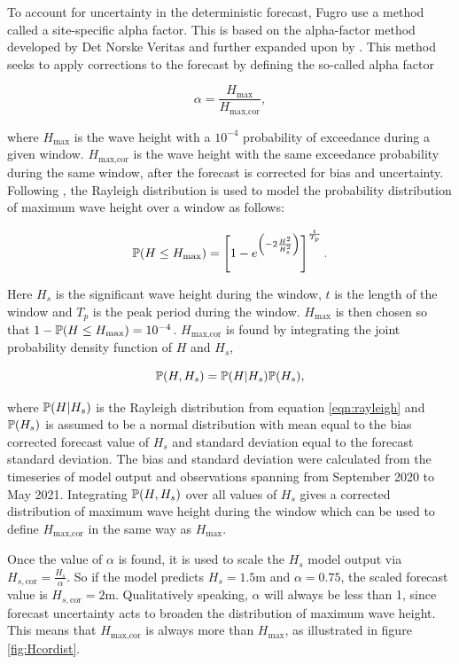 To account for uncertainty in the deterministic forecast, Fugro use a method called a site-specific alpha factor. This is based on the alpha-factor method developed by Det Norske Veritas \citep{DNV2011} and further expanded upon by \citet{Gintautas2016,Wilcken2012,Wu2021}. This method seeks to apply corrections to the forecast by defining the so-called alpha factor

\begin{equation}
\alpha = \frac{H_\text{max}}{H_\text{max,cor}},
\end{equation}

where $H_\text{max}$ is the wave height with a $10^{-4}$ probability of exceedance during a given window. $H_\text{max,cor}$ is the wave height with the same exceedance probability during the same window, after the forecast is corrected for bias and uncertainty. Following \cite{Liu1998}, the Rayleigh distribution is used to model the probability distribution of maximum wave height over a window as follows:

\begin{equation}
\mathbb{P} (H \leq H_\text{max}) = \left[ 1 - e^{\left( -2 \frac{H^2}{H_s^2} \right)} \right]^\frac{t}{T_p}.
\label{eqn:rayleigh}
\end{equation}

Here $H_s$ is the significant wave height during the window, $t$ is the length of the window and $T_p$ is the peak period during the window. $H_\text{max}$ is then chosen so that $1 - \mathbb{P} (H \leq H_\text{max}) = 10^{-4}$. $H_\text{max,cor}$ is found by integrating the joint probability density function of $H$ and $H_s$,

\begin{equation}
\mathbb{P} (H,H_s) = \mathbb{P} (H|H_s) \mathbb{P} (H_s),
\end{equation}

where $\mathbb{P} (H|H_s)$ is the Rayleigh distribution from equation \ref{eqn:rayleigh} and $\mathbb{P} (H_s)$ is assumed to be a normal distribution with mean equal to the bias corrected forecast value of $H_s$ and standard deviation equal to the forecast standard deviation. The bias and standard deviation were calculated from the timeseries of model output and observations spanning from September 2020 to May 2021. Integrating $\mathbb{P} (H,H_s)$ over all values of $H_s$ gives a corrected distribution of maximum wave height during the window which can be used to define $H_\text{max,cor}$ in the same way as $H_\text{max}$.

Once the value of $\alpha$ is found, it is used to scale the $H_s$ model output via $H_{s,\text{cor}} = \frac{H_s}{\alpha}$. So if the model predicts $H_s = 1.5$m and $\alpha = 0.75$, the scaled forecast value is $H_{s,\text{cor}} = 2$m. Qualitatively speaking, $\alpha$ will always be less than 1, since forecast uncertainty acts to broaden the distribution of maximum wave height. This means that $H_\text{max,cor}$ is always more than $H_\text{max}$, as illustrated in figure \ref{fig:Hcordist}.

